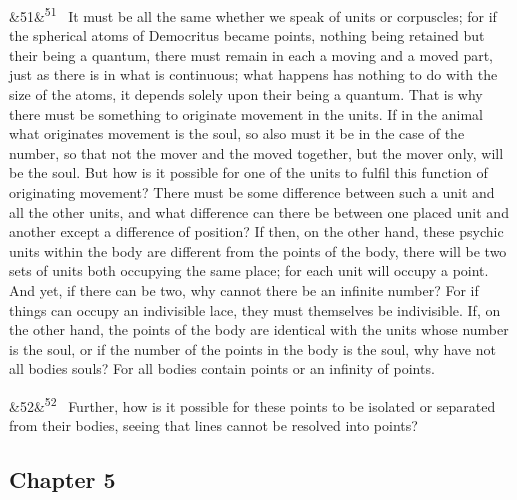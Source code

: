\documentclass[12pt]{article}
\newcommand{\para}[1][]{\par\noindent\ifx&#1&\else\textsuperscript{\footnotesize #1}~\fi}
\begin{document}
\para[51] It must be all the same whether we speak of units or corpuscles; for if the spherical atoms of Democritus became points, nothing being retained but their being a quantum, there must remain in each a moving and a moved part, just as there is in what is continuous; what happens has nothing to do with the size of the atoms, it depends solely upon their being a quantum. That is why there must be something to originate movement in the units. If in the animal what originates movement is the soul, so also must it be in the case of the number, so that not the mover and the moved together, but the mover only, will be the soul. But how is it possible for one of the units to fulfil this function of originating movement? There must be some difference between such a unit and all the other units, and what difference can there be between one placed unit and another except a difference of position? If then, on the other hand, these psychic units within the body are different from the points of the body, there will be two sets of units both occupying the same place; for each unit will occupy a point. And yet, if there can be two, why cannot there be an infinite number? For if things can occupy an indivisible lace, they must themselves be indivisible. If, on the other hand, the points of the body are identical with the units whose number is the soul, or if the number of the points in the body is the soul, why have not all bodies souls? For all bodies contain points or an infinity of points.

\para[52] Further, how is it possible for these points to be isolated or separated from their bodies, seeing that lines cannot be resolved into points?

\subsection*{Chapter 5}
\end{document}
